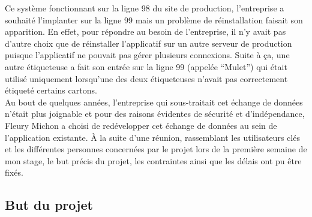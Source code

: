 \documentclass[a4paper,12pt]{extarticle}
\begin{document}
Ce système fonctionnant sur la ligne 98 du site de production, l’entreprise a souhaité l’implanter sur la ligne 99 mais un problème de réinstallation faisait son apparition. En effet, pour répondre au besoin de l'entreprise, il n'y avait pas d'autre choix que de réinstaller l'applicatif sur un autre serveur de production puisque l'applicatif ne pouvait pas gérer plusieurs connexions. Suite à ça, une autre étiqueteuse a fait son entrée sur la ligne 99 (appelée “Mulet”) qui était utilisé uniquement lorsqu’une des deux étiqueteuses n’avait pas correctement étiqueté certains cartons.\\
Au bout de quelques années, l’entreprise qui sous-traitait cet échange de données n’était plus joignable et pour des raisons évidentes de sécurité et d’indépendance, Fleury Michon a choisi de redévelopper cet échange de données au sein de l’application existante. À la suite d’une réunion, rassemblant les utilisateurs clés et les différentes personnes concernées par le projet lors de la première semaine de mon stage, le but précis du projet, les contraintes ainsi que les délais ont pu être fixés.

	\subsection{But du projet}
		\paragraph{}
\end{document}
